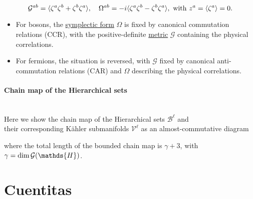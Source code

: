 \documentclass{homework}
\begin{document}
\begin{equation}
    \mathcal{G}^{ab} = \langle \zeta^a \zeta^b + \zeta^b \zeta^a \rangle, \quad \Omega^{ab} = -i \langle \zeta^a \zeta^b - \zeta^b \zeta^a \rangle, \textnormal{ with } z^a = \langle \zeta^a \rangle = 0. 
\end{equation}

\begin{itemize}
    \item For bosons, the \underline{symplectic form} $\Omega$ is fixed by canonical commutation relations (CCR), with the positive-definite \underline{metric} $\mathcal{G}$ containing the physical correlations. 
    \item For fermions, the situation is reversed, with $\mathcal{G}$ fixed by canonical anti-commutation relations (CAR) and $\Omega$ describing the physical correlations. 
\end{itemize}

\clearpage

\paragraph{Chain map of the Hierarchical sets} 

\blanky \\

Here we show the chain map of the Hierarchical sets ${\mathcal{B}}^{\ell}$ and \\
their corresponding K\"ahler submanifolds ${\mathcal{V}}^{\ell}$ as an almost-commutative diagram


where the total length of the bounded chain map is $\gamma + 3$, with $\gamma = \dim{{\cal G}(\mathds{H})}$. 

\section{Cuentitas}
\end{document}
